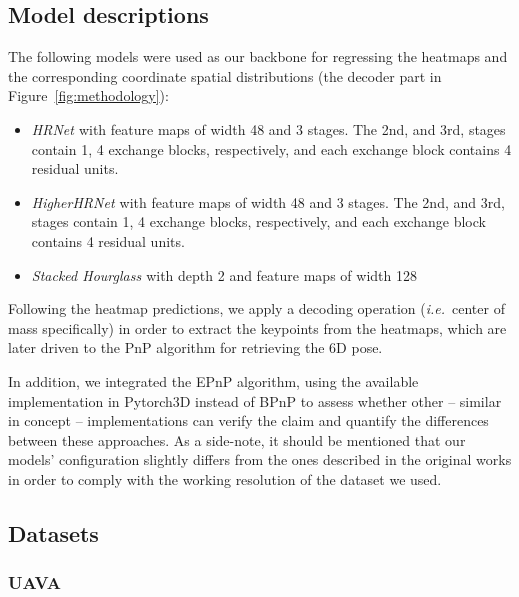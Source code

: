 \subsection{Model descriptions}
\label{sec:models}
The following models were used as our backbone for regressing the heatmaps and the corresponding coordinate spatial distributions (the decoder part in Figure~\ref{fig:methodology}):
\begin{itemize}
    \item \textit{HRNet \cite{sun2019deep}} with feature maps of width 48 and 3 stages. 
    The 2nd, and 3rd, stages contain 1, 4 exchange blocks, respectively, and each exchange block contains 4 residual units.
    \item\textit{HigherHRNet \cite{cheng2020higherhrnet}} with feature maps of width 48 and 3 stages. 
    The 2nd, and 3rd, stages contain 1, 4 exchange blocks, respectively, and each exchange block contains 4 residual units.
    \item \textit{Stacked Hourglass \cite{newell2016stacked}} with depth 2 and feature maps of width 128
\end{itemize}

Following the heatmap predictions, we apply a decoding operation (\textit{i.e.}~center of mass specifically) in order to extract the keypoints from the heatmaps, which are later driven to the PnP algorithm for retrieving the 6D pose. %

In addition, we integrated the EPnP \cite{lepetit2009epnp} algorithm, using the available implementation in Pytorch3D \cite{ravi2020pytorch3d} instead of BPnP to assess whether other -- similar in concept -- implementations can verify the claim and quantify the differences between these approaches.
As a side-note, it should be mentioned that our models' configuration slightly differs from the ones described in the original works in order to comply with the working resolution of the dataset we used.

\subsection{Datasets}
\subsubsection{UAVA}


